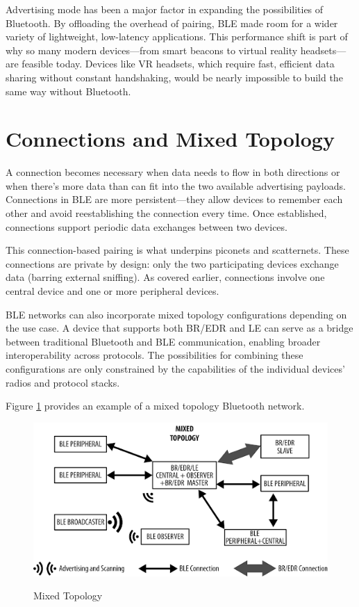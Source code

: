 Advertising mode has been a major factor in expanding the possibilities of Bluetooth. By offloading the overhead of pairing, BLE made room for a wider variety of lightweight, low-latency applications. This performance shift is part of why so many modern devices—from smart beacons to virtual reality headsets—are feasible today. Devices like VR headsets, which require fast, efficient data sharing without constant handshaking, would be nearly impossible to build the same way without Bluetooth.

\section{Connections and Mixed Topology}

A connection becomes necessary when data needs to flow in both directions or when there’s more data than can fit into the two available advertising payloads. Connections in BLE are more persistent—they allow devices to remember each other and avoid reestablishing the connection every time. Once established, connections support periodic data exchanges between two devices.

This connection-based pairing is what underpins piconets and scatternets. These connections are private by design: only the two participating devices exchange data (barring external sniffing). As covered earlier, connections involve one central device and one or more peripheral devices.

BLE networks can also incorporate mixed topology configurations depending on the use case. A device that supports both BR/EDR and LE can serve as a bridge between traditional Bluetooth and BLE communication, enabling broader interoperability across protocols. The possibilities for combining these configurations are only constrained by the capabilities of the individual devices' radios and protocol stacks.

Figure \ref{fig:mixedtopology} provides an example of a mixed topology Bluetooth network.

\begin{figure}[h]
    \caption{Mixed Topology}
    \includegraphics{mixedtopology.png}
    \label{fig:mixedtopology}
    \end{figure}

